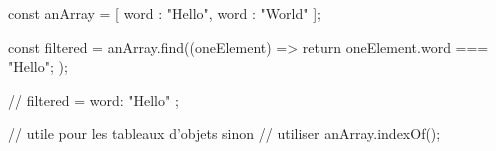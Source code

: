 const anArray = [ {word : "Hello"}, {word : "World"} ];

const filtered = anArray.find((oneElement) => {
    return oneElement.word === "Hello";
});

// filtered = { word: "Hello" };

// utile pour les tableaux d'objets sinon
// utiliser anArray.indexOf();